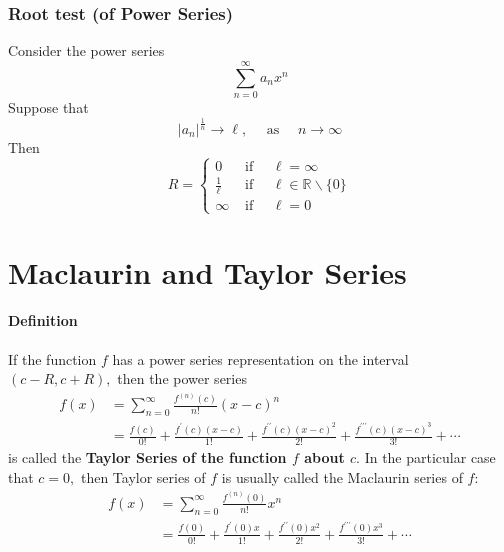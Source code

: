 \documentclass[11pt]{article}
\def\bm#1{\textbf{#1}}
\begin{document}
\subsubsection{Root test (of Power Series)}

Consider the power series
$$
\sum_{n=0}^{\infty} a_{n} x^{n}
$$
Suppose that
$$
\left|a_{n}\right|^{\frac{1}{n}} \rightarrow \ell, \quad \text { as } \quad n \rightarrow \infty
$$
Then
$$
R=\left\{\begin{array}{ll}
0 & \text { if } \quad \ell=\infty \\
\frac{1}{\ell} & \text { if } \quad \ell \in \mathbb{R} \backslash\{0\} \\
\infty & \text { if } \quad \ell=0
\end{array}\right.
$$

\newpage
\section{Maclaurin and Taylor Series}
\paragraph{Definition}
If the function $f$ has a power series representation on the interval $(c-R, c+R),$ then the power series
$$
\begin{aligned}
f(x) &=\sum_{n=0}^{\infty} \frac{f^{(n)}(c)}{n !}(x-c)^{n} \\
&=\frac{f(c)}{0 !}+\frac{f^{\prime}(c)(x-c)}{1 !}+\frac{f^{\prime \prime}(c)(x-c)^{2}}{2 !}+\frac{f^{\prime \prime \prime}(c)(x-c)^{3}}{3 !}+\cdots
\end{aligned}
$$
is called the \bm{Taylor Series of the function $f$ about $c$}. In the particular case that $c=0,$ then Taylor series of $f$ is usually called the Maclaurin series of $f:$
$$
\begin{aligned}
f(x) &=\sum_{n=0}^{\infty} \frac{f^{(n)}(0)}{n !} x^{n} \\
&=\frac{f(0)}{0 !}+\frac{f^{\prime}(0) x}{1 !}+\frac{f^{\prime \prime}(0) x^{2}}{2 !}+\frac{f^{\prime \prime \prime}(0) x^{3}}{3 !}+\cdots
\end{aligned}
$$
\\
\end{document}
